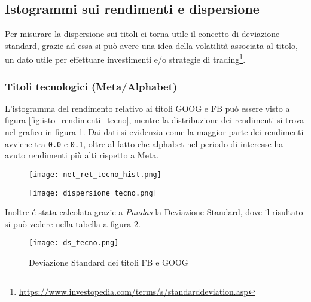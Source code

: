 \pagebreak

\subsection{Istogrammi sui rendimenti e dispersione}

Per misurare la dispersione sui titoli ci torna utile il concetto di deviazione standard, grazie ad essa si può avere una idea della
 volatilità associata al titolo, un dato utile per effettuare investimenti e/o strategie di 
trading\footnote{
  \href{https://www.investopedia.com/terms/s/standarddeviation.asp}{https://www.investopedia.com/terms/s/standarddeviation.asp}
}.\\

\subsubsection{Titoli tecnologici (Meta/Alphabet)}

L'istogramma del rendimento relativo ai titoli GOOG e FB può essere visto a figura \ref{fig:isto_rendimenti_tecno}, mentre la distribuzione dei 
rendimenti si trova nel grafico in figura \ref{fig:dispersione_tecno}.
Dai dati si evidenzia come la maggior parte dei rendimenti avviene tra \verb|0.0| e \verb|0.1|, oltre al fatto che alphabet nel periodo di interesse ha avuto rendimenti più alti
rispetto a Meta.

\begin{figure}[h]
  \centering
  \begin{minipage}{.5\textwidth}
    \centering
    \texttt{[image: net\_ret\_tecno\_hist.png]}
    \label{fig:isto_rendimenti_tecno}
  \end{minipage}%
  \begin{minipage}{.5\textwidth}
    \centering
    \texttt{[image: dispersione\_tecno.png]}
    \label{fig:dispersione_tecno}
  \end{minipage}
\end{figure}

Inoltre é stata calcolata grazie a \emph{Pandas} la Deviazione Standard, dove il risultato si può vedere nella tabella a figura \ref{fig:ds_tecno}.

\begin{figure}[h]
  \centering
  \texttt{[image: ds\_tecno.png]}
  \caption{Deviazione Standard dei titoli FB e GOOG}
  \label{fig:ds_tecno}
\end{figure}

